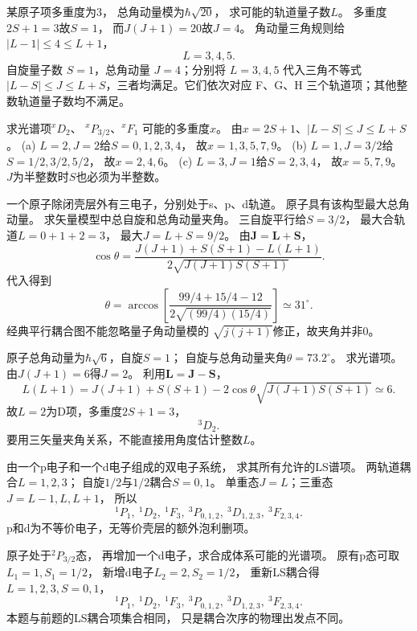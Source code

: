 某原子项多重度为3，
总角动量模为$\hbar\sqrt{20}$，
求可能的轨道量子数$L$。
\exsolution
多重度$2S+1=3$故$S=1$，
而$J(J+1)=20$故$J=4$。
角动量三角规则给
$|L-1|\le4\le L+1$，
\[
 \boxed{L=3,4,5}.
\]
\excheck 自旋量子数 $S=1$，总角动量 $J=4$；分别将 $L=3,4,5$ 代入三角不等式 $|L-S|\le J\le L+S$，三者均满足。它们依次对应 F、G、H 三个轨道项；其他整数轨道量子数均不满足。

求光谱项\({}^{x}D_2\)、
\({}^{x}P_{3/2}\)、\({}^{x}F_1\)
可能的多重度$x$。
\exsolution
由$x=2S+1$、$|L-S|\le J\le L+S$。
(a) $L=2,J=2$给$S=0,1,2,3,4$，
故$\boxed{x=1,3,5,7,9}$。
(b) $L=1,J=3/2$给$S=1/2,3/2,5/2$，
故$\boxed{x=2,4,6}$。
(c) $L=3,J=1$给$S=2,3,4$，
故$\boxed{x=5,7,9}$。
\excheck $J$为半整数时$S$也必须为半整数。

一个原子除闭壳层外有三电子，分别处于s、p、d轨道。
原子具有该构型最大总角动量。
求矢量模型中总自旋和总角动量夹角。
\exsolution
三自旋平行给$S=3/2$，
最大合轨道$L=0+1+2=3$，
最大$J=L+S=9/2$。
由$\boldsymbol J=\boldsymbol L+\boldsymbol S$，
\[
 \cos\theta=\frac{J(J+1)+S(S+1)-L(L+1)}
 {2\sqrt{J(J+1)S(S+1)}}.
\]
代入得到
\[
 \boxed{\theta=\arccos\left[
 \frac{99/4+15/4-12}{2\sqrt{(99/4)(15/4)}}\right]
 \simeq31^\circ}.
\]
\excheck 经典平行耦合图不能忽略量子角动量模的
$\sqrt{j(j+1)}$修正，故夹角并非0。

原子总角动量为$\hbar\sqrt6$，自旋$S=1$；
自旋与总角动量夹角$\theta=73.2^\circ$。
求光谱项。
\exsolution
由$J(J+1)=6$得$J=2$。
利用$\boldsymbol L=\boldsymbol J-\boldsymbol S$，
\[
 L(L+1)=J(J+1)+S(S+1)
 -2\cos\theta\sqrt{J(J+1)S(S+1)}\simeq6.
\]
故$L=2$为D项，多重度$2S+1=3$，
\[
 \boxed{{}^{3}D_2}.
\]
\excheck 要用三矢量夹角关系，不能直接用角度估计整数$L$。

由一个p电子和一个d电子组成的双电子系统，
求其所有允许的LS谱项。
\exsolution
两轨道耦合$L=1,2,3$；
自旋$1/2$与$1/2$耦合$S=0,1$。
单重态$J=L$；三重态$J=L-1,L,L+1$，
所以
\[
 \boxed{{}^{1}P_1,\ {}^{1}D_2,\ {}^{1}F_3,\
 {}^{3}P_{0,1,2},\ {}^{3}D_{1,2,3},\ {}^{3}F_{2,3,4}}.
\]
\excheck p和d为不等价电子，无等价壳层的额外泡利删项。

原子处于\({}^{2}P_{3/2}\)态，
再增加一个d电子，求合成体系可能的光谱项。
\exsolution
原有p态可取$L_1=1,S_1=1/2$，
新增d电子$L_2=2,S_2=1/2$，
重新LS耦合得$L=1,2,3,S=0,1$，
\[
 \boxed{{}^{1}P_1,\ {}^{1}D_2,\ {}^{1}F_3,\
 {}^{3}P_{0,1,2},\ {}^{3}D_{1,2,3},\ {}^{3}F_{2,3,4}}.
\]
\excheck 本题与前题的LS耦合项集合相同，
只是耦合次序的物理出发点不同。


